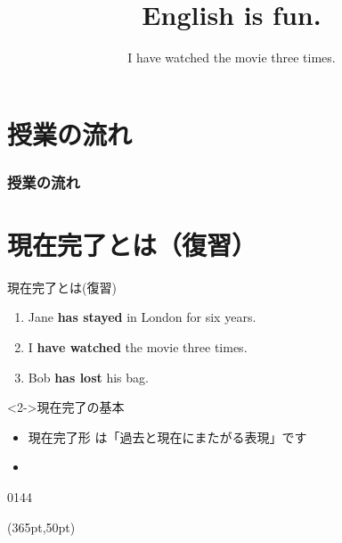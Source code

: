\documentclass[aspectratio=169,xcolor={dvipsnames,table}]{beamer}
\title{English is fun.}
\subtitle{I have watched the movie three times.}
\author{}
\institute[]{}
\date[]
\newcommand{\myaudio}[1]{\href{#1}{\faVolumeUp}}
\begin{document}
\begin{frame}[plain]
  \titlepage
\end{frame}

\section*{授業の流れ}
\begin{frame}[plain]
  \frametitle{授業の流れ}
  \tableofcontents
\end{frame}

\section*{現在完了とは（復習）}
\begin{frame}[plain]{現在完了とは(復習)}
 \begin{enumerate}
 \item Jane \textcolor{NavyBlue}{\bfseries has stayed} in London for six years.
 \item I \textcolor{NavyBlue}{\bfseries have watched} the movie three times.
 \item Bob \textcolor{NavyBlue}{\bfseries has lost} his bag.
\end{enumerate}

\vspace{30pt}

 \begin{block}<2->{現在完了の基本}
\small
\begin{itemize}[square]
 \item<3->  現在完了形\,\,は「過去と現在にまたがる表現」です\\
\hfill{}
 \item {}%
\end{itemize}
      \end{block}
\hfill{\tiny 0144}\,{\scriptsize \myaudio{./audio/013_have_pp_keiken_01.mp3}}

\begin{textblock*}{0.4\linewidth}(365pt,50pt)
\end{textblock*}
\end{frame}
\end{document}
